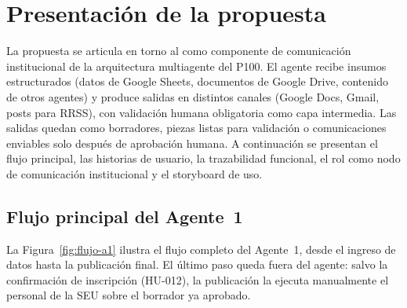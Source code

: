 \documentclass[a4paper, 12pt]{article}
\begin{document}
\section{Presentaci\'on de la propuesta}

La propuesta se articula en torno al \agenteUno{} como componente de comunicaci\'on institucional de la arquitectura multiagente del \ac{P100}. El agente recibe insumos estructurados (datos de Google Sheets, documentos de Google Drive, contenido de otros agentes) y produce salidas en distintos canales (Google Docs, Gmail, posts para \ac{RRSS}), con validaci\'on humana obligatoria como capa intermedia. Las salidas quedan como borradores, piezas listas para validaci\'on o comunicaciones enviables solo despu\'es de aprobaci\'on humana. A continuaci\'on se presentan el flujo principal, las historias de usuario, la trazabilidad funcional, el rol como nodo de comunicaci\'on institucional y el storyboard de uso.

\subsection{Flujo principal del Agente~1}

La Figura~\ref{fig:flujo-a1} ilustra el flujo completo del Agente~1, desde el ingreso de datos hasta la publicaci\'on final. El \'ultimo paso queda fuera del agente: salvo la confirmaci\'on de inscripci\'on (HU-012), la publicaci\'on la ejecuta manualmente el personal de la \ac{SEU} sobre el borrador ya aprobado.
\end{document}

